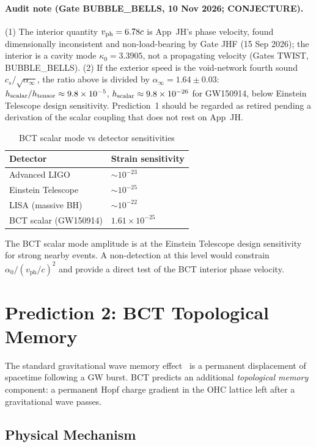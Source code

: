 \documentclass[aps,prl,twocolumn,superscriptaddress,showpacs]{revtex4-2}
\begin{document}
\paragraph*{Audit note (Gate BUBBLE\_BELLS, 10 Nov 2026; CONJECTURE).} (1) The interior quantity $v_{\rm ph}=6.78c$ is App~JH's phase velocity, found dimensionally inconsistent and non-load-bearing by Gate JHF (15 Sep 2026); the interior is a cavity mode $\kappa_0=3.3905$, not a propagating velocity (Gates TWIST, BUBBLE\_BELLS). (2) If the exterior speed is the void-network fourth sound $c_s/\sqrt{\alpha_\infty}$, the ratio above is divided by $\alpha_\infty=1.64\pm0.03$: $h_{\rm scalar}/h_{\rm tensor}\approx9.8\times10^{-5}$, $h_{\rm scalar}\approx9.8\times10^{-26}$ for GW150914, below Einstein Telescope design sensitivity. Prediction~1 should be regarded as retired pending a derivation of the scalar coupling that does not rest on App~JH.


\begin{table}[h]
\centering
\caption{BCT scalar mode vs detector sensitivities}
\begin{tabular}{ll}
\hline\hline
Detector & Strain sensitivity \\
\hline
Advanced LIGO & $\sim 10^{-23}$ \\
Einstein Telescope & $\sim 10^{-25}$ \\
LISA (massive BH) & $\sim 10^{-22}$ \\
BCT scalar (GW150914) & $1.61\times10^{-25}$ \\
\hline\hline
\end{tabular}
\end{table}

The BCT scalar mode amplitude is at the Einstein Telescope 
design sensitivity for strong nearby events. A non-detection 
at this level would constrain $\alpha_0/(v_\mathrm{ph}/c)^2$ 
and provide a direct test of the BCT interior phase velocity.

\section{Prediction 2: BCT Topological Memory}

The standard gravitational wave memory effect~\cite{GWMemory} 
is a permanent displacement of spacetime following a GW burst. 
BCT predicts an additional \emph{topological memory} component: 
a permanent Hopf charge gradient in the OHC lattice left after 
a gravitational wave passes.

\subsection{Physical Mechanism}
\end{document}
